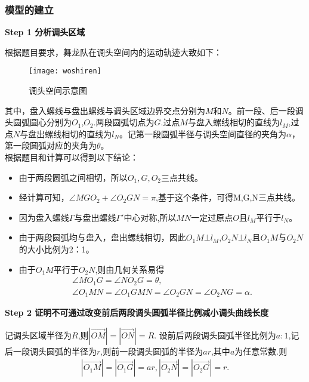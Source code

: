 \documentclass{cumcmthesis}
\begin{document}
\subsubsection{模型的建立}
\noindent\textbf{Step 1 分析调头区域}
\par 根据题目要求，舞龙队在调头空间内的运动轨迹大致如下：
\begin{figure}[!h]
    \centering
    \texttt{[image: woshiren]}
    \caption{调头空间示意图}
  \label{2.2.2.2.2.2} 
\end{figure}
\par 其中，盘入螺线与盘出螺线与调头区域边界交点分别为$M$和$N$。前一段、后一段调头圆弧圆心分别为$O_1$,$O_2$.两段圆弧切点为$G$.过点$M$与盘入螺线相切的直线为$l_M$,过点$N$与盘出螺线相切的直线为$l_N$。记第一段圆弧半径与调头空间直径的夹角为$\alpha $，第一段圆弧对应的夹角为$\theta $。
\\ 根据题目和计算可以得到以下结论：
\begin{itemize}
    \item  由于两段圆弧之间相切，所以$O_1,G,O_2$三点共线。
    \item  经计算可知，$\angle MGO_2+\angle O_2GN=\pi $,基于这个条件，可得M,G,N三点共线。
    \item  因为盘入螺线$\varGamma$与盘出螺线$\varGamma'$中心对称,所以$MN$一定过原点$O$且$l_M$平行于$ l_N$。
    \item  由于两段圆弧均与盘入，盘出螺线相切，因此$O_1M\bot l_M${,}$O_2N\bot l_N$且$O_1M$与$O_2N$的大小比例为2：1。
    \item  由于$O_1M $平行于$ O_2N$,则由几何关系易得
\begin{gather}
\angle MO_1G=\angle NO_2G=\theta,\label{1.........33}
\\
\angle O_1MN=\angle O_1GMN=\angle O_2GN=\angle O_2NG=\alpha .\label{1.........34}
\end{gather}
    \end{itemize} 
    \noindent\textbf{Step 2 证明不可通过改变前后两段调头圆弧半径比例减小调头曲线长度} 
\par 记调头区域半径为$R$,则$\left| \overrightarrow{OM} \right|=\left| \overrightarrow{ON} \right|=R$. 设前后两段调头圆弧半径比例为$a:1$,记后一段调头圆弧的半径为$r$,则前一段调头圆弧的半径为$ar$,其中$a$为任意常数.则
\begin{align}\label{1.........35}
\left| \overrightarrow{O_1M} \right|=\left| \overrightarrow{O_1G} \right|=ar,\left| \overrightarrow{O_2N} \right|=\left| \overrightarrow{O_2G} \right|=r.    
\end{align}
\end{document}
